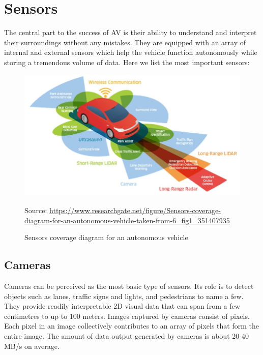 \documentclass[10pt,oneside,english,a4paper]{article}
\begin{document}

\section{Sensors} \label{sensors}

\indent The central part to the success of AV is their ability to understand and interpret their surroundings without any mistakes. They are equipped with an array of internal and external sensors which help the vehicle function autonomously while storing a tremendous volume of data. Here we list the most important sensors:

\begin{figure}[!h]
\centering
\includegraphics[scale=0.4]{SensorsScheme.png}
\caption{Sensors coverage diagram for an autonomous vehicle}
{Source: \url{https://www.researchgate.net/figure/Sensors-coverage-diagram-for-an-autonomous-vehicle-taken-from-6_fig1_351407935}}
\label{fig:p_sensors}
\end{figure}


\subsection{Cameras}
\par Cameras can be perceived as the most basic type of sensors. Its role is to detect objects such as lanes, traffic signs and lights, and pedestrians to name a few. They provide readily interpretable 2D visual data that can span from a few centimetres to up to 100 meters. Images captured by cameras consist of pixels. Each pixel in an image collectively contributes to an array of pixels that form the entire image. The amount of data output generated by cameras is about 20-40 MB/s on average.
\end{document}
